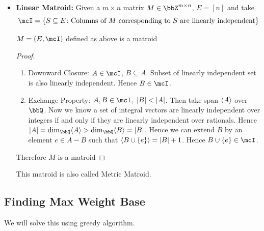 \begin{itemize}[label=$\bullet$]
\item \textbf{Linear Matroid:} Given a $m\times n$ matrix $M\in \bbZ^{m\times n}$, $E=[n]$ and take $$\mcI=\{S\subseteq E\colon \text{Columns of $M$ corresponding to $S$ are linearly independent} \}$$
\begin{lemma}{}{}
	$M=(E,\mcI)$ defined as above is a matroid
\end{lemma}
\begin{proof}
	\begin{enumerate}[label=\bfseries\tiny\protect\circled{\small\arabic*}]
		\item Downward Closure: $A\in \mcI$, $B\subseteq A$. Subset of linearly independent set is also linearly independent. Hence $B\in \mcI$. 
		\item Exchange Property: $A,B\in\mcI,\ |B|<|A|$. Then take span $\langle A\rangle$ over $\bbQ$. Now we know a set of integral vectors are linearly independent over integers if and only if they are linearly independent over rationals. Hence $|A|=\dim _{\bbQ}\la A\ra> \dim _{\bbQ}\la B\ra=|B|$. Hence we can extend $B$ by an element $e\in A-B$ such that $\langle B\cup \{e\}\rangle =|B|+1$. Hence $B\cup \{e\}\in \mcI$.
	\end{enumerate}Therefore $M$ is a matroid
\end{proof}
This matroid is also called Metric Matroid.
\end{itemize}
\subsection{Finding Max Weight Base}\label{matroid-max-weight-base}
\begin{algoprob}
\end{algoprob}

We will solve this using greedy algorithm.

